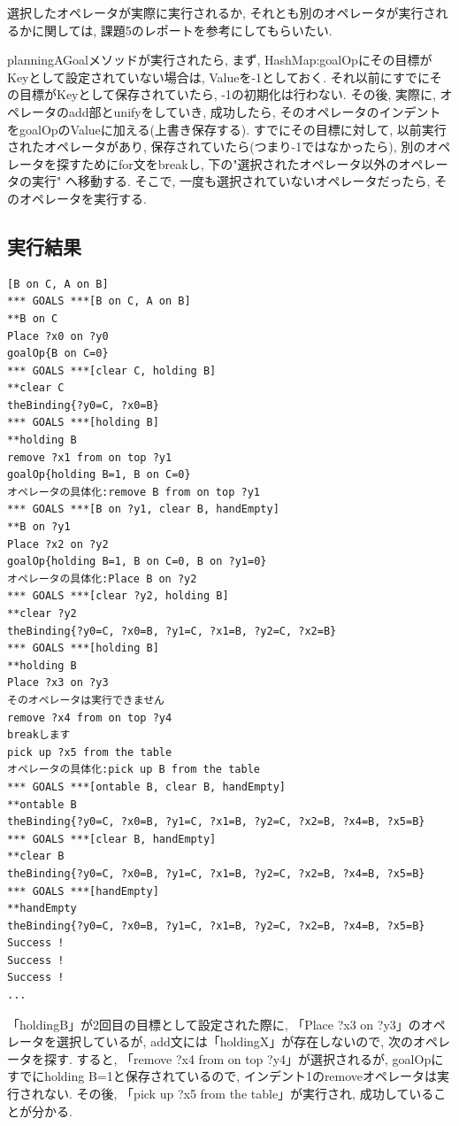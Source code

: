 \documentclass[12pt]{jarticle}
\begin{document}
選択したオペレータが実際に実行されるか, それとも別のオペレータが実行されるかに関しては, 課題5のレポートを参考にしてもらいたい.

planningAGoalメソッドが実行されたら, まず, HashMap:goalOpにその目標がKeyとして設定されていない場合は, Valueを-1としておく. それ以前にすでにその目標がKeyとして保存されていたら, -1の初期化は行わない. その後, 実際に, オペレータのadd部とunifyをしていき, 成功したら, そのオペレータのインデントをgoalOpのValueに加える(上書き保存する). すでにその目標に対して, 以前実行されたオペレータがあり, 保存されていたら(つまり-1ではなかったら), 別のオペレータを探すためにfor文をbreakし, 下の"選択されたオペレータ以外のオペレータの実行" へ移動する. そこで, 一度も選択されていないオペレータだったら, そのオペレータを実行する.

\subsection{実行結果}
\begin{lstlisting}[caption=goalOpによって制約される , label=src:No1]
[B on C, A on B]
*** GOALS ***[B on C, A on B]
**B on C
Place ?x0 on ?y0
goalOp{B on C=0}
*** GOALS ***[clear C, holding B]
**clear C
theBinding{?y0=C, ?x0=B}
*** GOALS ***[holding B]
**holding B
remove ?x1 from on top ?y1
goalOp{holding B=1, B on C=0}
オペレータの具体化:remove B from on top ?y1
*** GOALS ***[B on ?y1, clear B, handEmpty]
**B on ?y1
Place ?x2 on ?y2
goalOp{holding B=1, B on C=0, B on ?y1=0}
オペレータの具体化:Place B on ?y2
*** GOALS ***[clear ?y2, holding B]
**clear ?y2
theBinding{?y0=C, ?x0=B, ?y1=C, ?x1=B, ?y2=C, ?x2=B}
*** GOALS ***[holding B]
**holding B
Place ?x3 on ?y3
そのオペレータは実行できません
remove ?x4 from on top ?y4
breakします
pick up ?x5 from the table
オペレータの具体化:pick up B from the table
*** GOALS ***[ontable B, clear B, handEmpty]
**ontable B
theBinding{?y0=C, ?x0=B, ?y1=C, ?x1=B, ?y2=C, ?x2=B, ?x4=B, ?x5=B}
*** GOALS ***[clear B, handEmpty]
**clear B
theBinding{?y0=C, ?x0=B, ?y1=C, ?x1=B, ?y2=C, ?x2=B, ?x4=B, ?x5=B}
*** GOALS ***[handEmpty]
**handEmpty
theBinding{?y0=C, ?x0=B, ?y1=C, ?x1=B, ?y2=C, ?x2=B, ?x4=B, ?x5=B}
Success !
Success !
Success !
...
\end{lstlisting}

「holdingB」が2回目の目標として設定された際に, 「Place ?x3 on ?y3」のオペレータを選択しているが, add文には「holdingX」が存在しないので, 次のオペレータを探す. すると, 「remove ?x4 from on top ?y4」が選択されるが, goalOpにすでに{holding B=1}と保存されているので, インデント1のremoveオペレータは実行されない. その後, 「pick up ?x5 from the table」が実行され, 成功していることが分かる.
\end{document}
